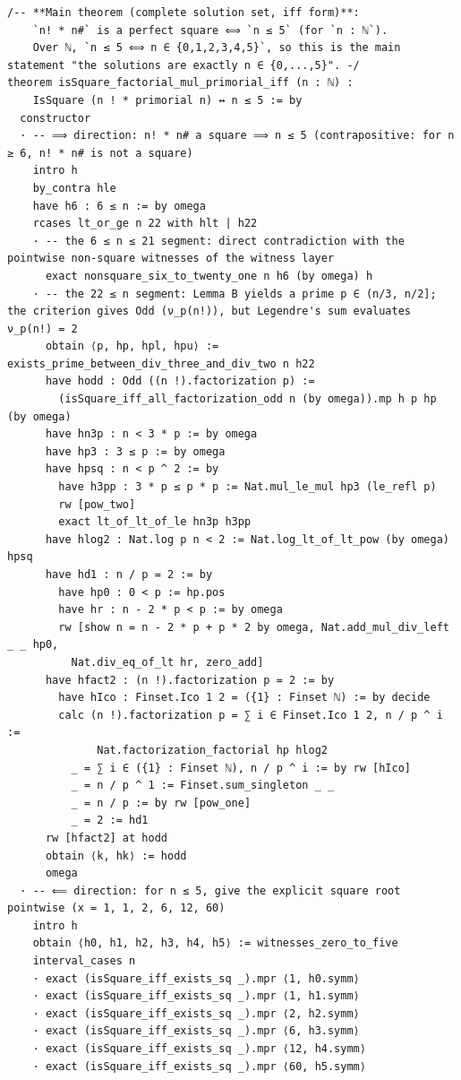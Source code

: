 \documentclass[11pt]{article}
\theoremstyle{definition}
\begin{document}
\begin{lstlisting}
/-- **Main theorem (complete solution set, iff form)**:
    `n! * n#` is a perfect square ⟺ `n ≤ 5` (for `n : ℕ`).
    Over ℕ, `n ≤ 5 ⟺ n ∈ {0,1,2,3,4,5}`, so this is the main statement "the solutions are exactly n ∈ {0,...,5}". -/
theorem isSquare_factorial_mul_primorial_iff (n : ℕ) :
    IsSquare (n ! * primorial n) ↔ n ≤ 5 := by
  constructor
  · -- ⟹ direction: n! * n# a square ⟹ n ≤ 5 (contrapositive: for n ≥ 6, n! * n# is not a square)
    intro h
    by_contra hle
    have h6 : 6 ≤ n := by omega
    rcases lt_or_ge n 22 with hlt | h22
    · -- the 6 ≤ n ≤ 21 segment: direct contradiction with the pointwise non-square witnesses of the witness layer
      exact nonsquare_six_to_twenty_one n h6 (by omega) h
    · -- the 22 ≤ n segment: Lemma B yields a prime p ∈ (n/3, n/2]; the criterion gives Odd (ν_p(n!)), but Legendre's sum evaluates ν_p(n!) = 2
      obtain ⟨p, hp, hpl, hpu⟩ := exists_prime_between_div_three_and_div_two n h22
      have hodd : Odd ((n !).factorization p) :=
        (isSquare_iff_all_factorization_odd n (by omega)).mp h p hp (by omega)
      have hn3p : n < 3 * p := by omega
      have hp3 : 3 ≤ p := by omega
      have hpsq : n < p ^ 2 := by
        have h3pp : 3 * p ≤ p * p := Nat.mul_le_mul hp3 (le_refl p)
        rw [pow_two]
        exact lt_of_lt_of_le hn3p h3pp
      have hlog2 : Nat.log p n < 2 := Nat.log_lt_of_lt_pow (by omega) hpsq
      have hd1 : n / p = 2 := by
        have hp0 : 0 < p := hp.pos
        have hr : n - 2 * p < p := by omega
        rw [show n = n - 2 * p + p * 2 by omega, Nat.add_mul_div_left _ _ hp0,
          Nat.div_eq_of_lt hr, zero_add]
      have hfact2 : (n !).factorization p = 2 := by
        have hIco : Finset.Ico 1 2 = ({1} : Finset ℕ) := by decide
        calc (n !).factorization p = ∑ i ∈ Finset.Ico 1 2, n / p ^ i :=
              Nat.factorization_factorial hp hlog2
          _ = ∑ i ∈ ({1} : Finset ℕ), n / p ^ i := by rw [hIco]
          _ = n / p ^ 1 := Finset.sum_singleton _ _
          _ = n / p := by rw [pow_one]
          _ = 2 := hd1
      rw [hfact2] at hodd
      obtain ⟨k, hk⟩ := hodd
      omega
  · -- ⟸ direction: for n ≤ 5, give the explicit square root pointwise (x = 1, 1, 2, 6, 12, 60)
    intro h
    obtain ⟨h0, h1, h2, h3, h4, h5⟩ := witnesses_zero_to_five
    interval_cases n
    · exact (isSquare_iff_exists_sq _).mpr ⟨1, h0.symm⟩
    · exact (isSquare_iff_exists_sq _).mpr ⟨1, h1.symm⟩
    · exact (isSquare_iff_exists_sq _).mpr ⟨2, h2.symm⟩
    · exact (isSquare_iff_exists_sq _).mpr ⟨6, h3.symm⟩
    · exact (isSquare_iff_exists_sq _).mpr ⟨12, h4.symm⟩
    · exact (isSquare_iff_exists_sq _).mpr ⟨60, h5.symm⟩


\end{lstlisting}
\end{document}
